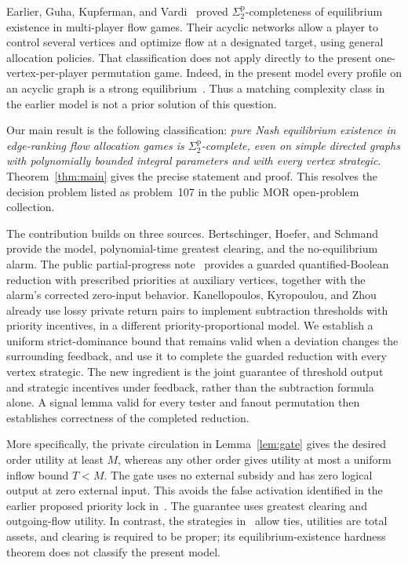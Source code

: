 \documentclass[11pt]{article}
\newcommand{\sig}{\Sigma^{\mathrm p}_2}
\begin{document}
Earlier, Guha, Kupferman, and Vardi~\cite{gkv} proved $\sig$-completeness of equilibrium existence in multi-player flow games. Their acyclic networks allow a player to control several vertices and optimize flow at a designated target, using general allocation policies. That classification does not apply directly to the present one-vertex-per-player permutation game. Indeed, in the present model every profile on an acyclic graph is a strong equilibrium~\cite[Proposition~1]{bhs}. Thus a matching complexity class in the earlier model is not a prior solution of this question.

Our main result is the following classification: \emph{pure Nash equilibrium existence in edge-ranking flow allocation games is $\sig$-complete, even on simple directed graphs with polynomially bounded integral parameters and with every vertex strategic}. Theorem~\ref{thm:main} gives the precise statement and proof. This resolves the decision problem listed as problem~107 in the public MOR open-problem collection.

The contribution builds on three sources. Bertschinger, Hoefer, and Schmand~\cite{bhs} provide the model, polynomial-time greatest clearing, and the no-equilibrium alarm. The public partial-progress note~\cite{progress} provides a guarded quantified-Boolean reduction with prescribed priorities at auxiliary vertices, together with the alarm's corrected zero-input behavior. Kanellopoulos, Kyropoulou, and Zhou~\cite[Section~6]{kkz} already use lossy private return pairs to implement subtraction thresholds with priority incentives, in a different priority-proportional model. We establish a uniform strict-dominance bound that remains valid when a deviation changes the surrounding feedback, and use it to complete the guarded reduction with every vertex strategic. The new ingredient is the joint guarantee of threshold output and strategic incentives under feedback, rather than the subtraction formula alone. A signal lemma valid for every tester and fanout permutation then establishes correctness of the completed reduction.

More specifically, the private circulation in Lemma~\ref{lem:gate} gives the desired order utility at least $M$, whereas any other order gives utility at most a uniform inflow bound $T<M$. The gate uses no external subsidy and has zero logical output at zero external input. This avoids the false activation identified in the earlier proposed priority lock in~\cite{progress}. The guarantee uses greatest clearing and outgoing-flow utility. In contrast, the strategies in~\cite{kkz} allow ties, utilities are total assets, and clearing is required to be proper; its equilibrium-existence hardness theorem does not classify the present model.
\end{document}
